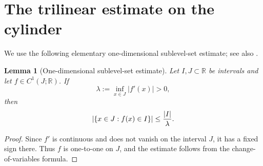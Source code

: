 \documentclass[12pt,oneside,reqno]{amsart}
\numberwithin{equation}{section}
\theoremstyle{plain}
\newtheorem{lemma}[theorem]{Lemma}
\def\R{{\mathbb R}}
\newcommand{\abs}[1]{%
    \left|#1\right|%
}
\newcommand{\brs}[1]{%
    \left\{#1\right\}
}
\begin{document}
\section{The trilinear estimate on the cylinder}
We use the following elementary one-dimensional sublevel-set estimate; see
also \cite[Lemma~3.8]{molinet2015bilinear}.

\begin{lemma}[One-dimensional sublevel-set estimate]
\label{Lem:Lemma3.8}
Let $I,J\subset\R$ be intervals and let $f\in C^1(J;\R)$. If
\begin{equation*}
    \lambda:=\inf_{x\in J}\abs{f'(x)}>0,
\end{equation*}
then
\begin{equation}
\label{eq:one-dimensional-sublevel-estimate}
    \abs{\brs{x\in J:f(x)\in I}}
    \leq
    \frac{\abs{I}}{\lambda}.
\end{equation}
\end{lemma}

\begin{proof}
Since $f'$ is continuous and does not vanish on the interval $J$, it has a fixed sign there. Thus $f$ is one-to-one on $J$, and the estimate follows
from the change-of-variables formula.
\end{proof}
\end{document}

